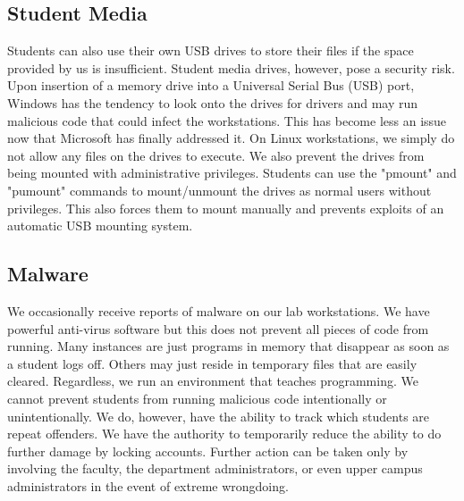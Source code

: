\subsection{Student Media}
Students can also use their own USB drives to store their files if the space provided by us is insufficient.  Student media drives, however, pose a security risk. Upon insertion of a memory drive into a Universal Serial Bus (USB) port, Windows has the tendency to look onto the drives for drivers and may run malicious code that could infect the workstations.  This has become less an issue now that Microsoft has finally addressed it.  On Linux workstations, we simply do not allow any files on the drives to execute.  We also prevent the drives from being mounted with administrative privileges.  Students can use the "pmount" and "pumount" commands to mount/unmount the drives as normal users without privileges.  This also forces them to mount manually and prevents exploits of an automatic USB mounting system.  

\subsection{Malware}
We occasionally receive reports of malware on our lab workstations.  We have powerful anti-virus software but this does not prevent all pieces of code from running.  Many instances are just programs in memory that disappear as soon as a student logs off.  Others may just reside in temporary files that are easily cleared.  Regardless, we run an environment that teaches programming.  We cannot prevent students from running malicious code intentionally or unintentionally.  We do, however, have the ability to track which students are repeat offenders.  We have the authority to temporarily reduce the ability to do further damage by locking accounts.  Further action can be taken only by involving the faculty, the department administrators, or even upper campus administrators in the event of extreme wrongdoing. 
